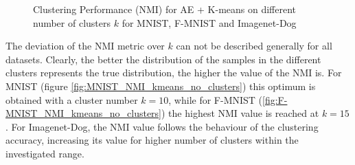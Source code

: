 \documentclass[12pt,DIV14,BCOR12mm,a4paper,footexclude,headinclude,halfparskip-,twoside,openright,cleardoubleempty,idxtotoc,bibtotoc,listtotoc,abstracton]{scrreprt} %
\numberwithin{equation}{chapter}
\begin{document}
	 \begin{figure}[htb!]
		\centering
		\qquad
		\qquad
		\caption{Clustering Performance (NMI) for AE + K-means on different number of clusters $k$ for MNIST, F-MNIST and Imagenet-Dog}
		\label{fig:ClusterPerformance_NMI_kmeans_no_clusters}
	\end{figure}
The deviation of the NMI metric over $k$ can not be described generally for all datasets. Clearly, the better the distribution of the samples in the different clusters represents the true distribution, the higher the value of the NMI is. For MNIST (figure \ref{fig:MNIST_NMI_kmeans_no_clusters}) this optimum is obtained with a cluster number $k=10$, while for F-MNIST (\ref{fig:F-MNIST_NMI_kmeans_no_clusters}) the highest NMI value is reached at $k=15$. For Imagenet-Dog, the NMI value follows the behaviour of the clustering accuracy, increasing its value for higher number of clusters within the investigated range.\\
\end{document}
